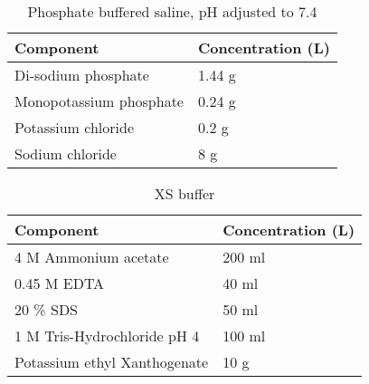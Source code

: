 \documentclass[11pt]{article}
\begin{document}
\begin{table}
\caption{Phosphate buffered saline, pH adjusted to 7.4}
\begin{tabular}{  p{6.9cm} | p{6.9cm}  }
\hline
Component & Concentration (L) \\
\hline
Di-sodium phosphate  & 1.44 g \\
  Monopotassium phosphate  & 0.24 g  \\
    Potassium chloride  &  0.2 g  \\
      Sodium chloride  & 8 g  \\
  \hline
\end{tabular}
\end{table}

\begin{table}
\caption{XS buffer}
\begin{tabular}{  p{6.9cm} | p{6.9cm}  }
\hline
Component & Concentration (L) \\
\hline
 4 M Ammonium acetate & 200 ml  \\
  0.45 M EDTA  & 40 ml \\
    20 \% SDS  & 50 ml \\
    1 M Tris-Hydrochloride pH 4    & 100 ml  \\
        Potassium ethyl Xanthogenate  & 10 g  \\
  \hline
\end{tabular}
\end{table}
\FloatBarrier
\end{document}
